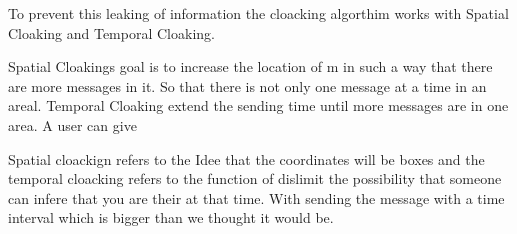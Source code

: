 \documentclass{llncs}
\begin{document}
To prevent this leaking of information the cloacking algorthim works with Spatial Cloaking and Temporal Cloaking. 

Spatial Cloakings goal is to increase the location of m in such a way that there are more messages in it. So that there is not only one message at a time in an areal. Temporal Cloaking extend the sending time until more messages are in one area.  A user can give 


Spatial cloackign refers to the Idee that the coordinates will be boxes and the temporal cloacking refers to the function of dislimit the possibility that someone can infere that you are their at that time. With sending the message with a time interval which is bigger than we thought it would be. 

\end{document}
